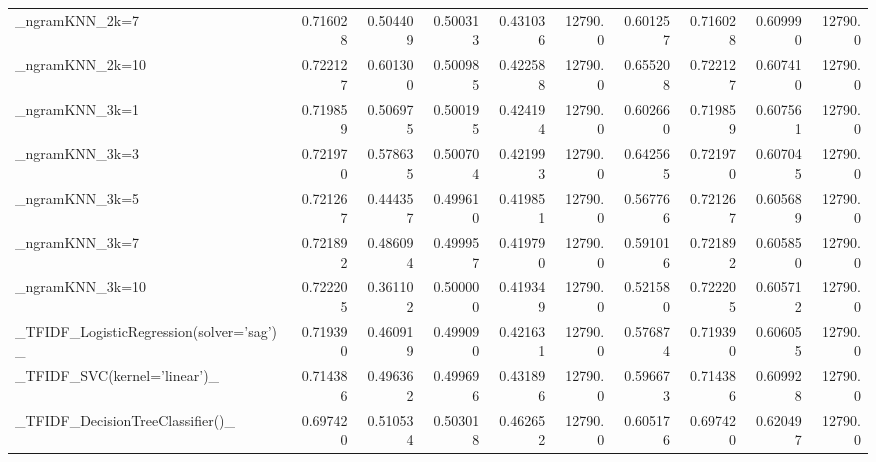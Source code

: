 \begin{tabular}{lrrrrrrrrr}
\_ngramKNN\_2k=7                                     &  0.716028 &         0.504409 &      0.500313 &        0.431036 &        12790.0 &            0.601257 &         0.716028 &           0.609990 &           12790.0 \\
\_ngramKNN\_2k=10                                    &  0.722127 &         0.601300 &      0.500985 &        0.422588 &        12790.0 &            0.655208 &         0.722127 &           0.607410 &           12790.0 \\
\_ngramKNN\_3k=1                                     &  0.719859 &         0.506975 &      0.500195 &        0.424194 &        12790.0 &            0.602660 &         0.719859 &           0.607561 &           12790.0 \\
\_ngramKNN\_3k=3                                     &  0.721970 &         0.578635 &      0.500704 &        0.421993 &        12790.0 &            0.642565 &         0.721970 &           0.607045 &           12790.0 \\
\_ngramKNN\_3k=5                                     &  0.721267 &         0.444357 &      0.499610 &        0.419851 &        12790.0 &            0.567766 &         0.721267 &           0.605689 &           12790.0 \\
\_ngramKNN\_3k=7                                     &  0.721892 &         0.486094 &      0.499957 &        0.419790 &        12790.0 &            0.591016 &         0.721892 &           0.605850 &           12790.0 \\
\_ngramKNN\_3k=10                                    &  0.722205 &         0.361102 &      0.500000 &        0.419349 &        12790.0 &            0.521580 &         0.722205 &           0.605712 &           12790.0 \\
\_TFIDF\_LogisticRegression(solver='sag')\_           &  0.719390 &         0.460919 &      0.499090 &        0.421631 &        12790.0 &            0.576874 &         0.719390 &           0.606055 &           12790.0 \\
\_TFIDF\_SVC(kernel='linear')\_                       &  0.714386 &         0.496362 &      0.499696 &        0.431896 &        12790.0 &            0.596673 &         0.714386 &           0.609928 &           12790.0 \\
\_TFIDF\_DecisionTreeClassifier()\_                   &  0.697420 &         0.510534 &      0.503018 &        0.462652 &        12790.0 &            0.605176 &         0.697420 &           0.620497 &           12790.0 \\

\end{tabular}
